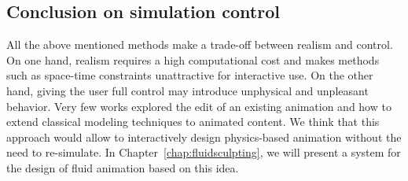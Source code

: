 \subsection{Conclusion on simulation control}

All the above mentioned methods make a trade-off between realism and control.
On one hand, realism requires a high computational cost and makes methods such as space-time constraints unattractive for interactive use.
On the other hand, giving the user full control may introduce unphysical and unpleasant behavior.
Very few works explored the edit of an existing animation and how to extend classical modeling techniques to animated content.
We think that this approach would allow to interactively design physics-based animation without the need to re-simulate.
In Chapter~\ref{chap:fluidsculpting}, we will present a system for the design of fluid animation based on this idea.